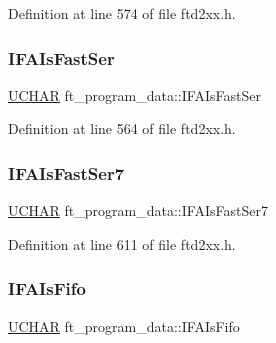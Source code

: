 Definition at line 574 of file ftd2xx.\+h.

\mbox{\label{structft__program__data_ac183f4ed8ee74ecc9a006962c1ef793c}} 
\subsubsection{\texorpdfstring{I\+F\+A\+Is\+Fast\+Ser}{IFAIsFastSer}}
{\footnotesize\ttfamily \hyperlink{CatCaloProto40MHz_2inc_2WinTypes_8h_a4f4bb67531a9bf6f0b9c6ad76aeba587}{U\+C\+H\+AR} ft\+\_\+program\+\_\+data\+::\+I\+F\+A\+Is\+Fast\+Ser}



Definition at line 564 of file ftd2xx.\+h.

\mbox{\label{structft__program__data_ac3f9c09e31314252360e6c9a44606487}} 
\subsubsection{\texorpdfstring{I\+F\+A\+Is\+Fast\+Ser7}{IFAIsFastSer7}}
{\footnotesize\ttfamily \hyperlink{CatCaloProto40MHz_2inc_2WinTypes_8h_a4f4bb67531a9bf6f0b9c6ad76aeba587}{U\+C\+H\+AR} ft\+\_\+program\+\_\+data\+::\+I\+F\+A\+Is\+Fast\+Ser7}



Definition at line 611 of file ftd2xx.\+h.

\mbox{\label{structft__program__data_ac2bc8bf7e54408c73c4010d922cf809d}} 
\subsubsection{\texorpdfstring{I\+F\+A\+Is\+Fifo}{IFAIsFifo}}
{\footnotesize\ttfamily \hyperlink{CatCaloProto40MHz_2inc_2WinTypes_8h_a4f4bb67531a9bf6f0b9c6ad76aeba587}{U\+C\+H\+AR} ft\+\_\+program\+\_\+data\+::\+I\+F\+A\+Is\+Fifo}



